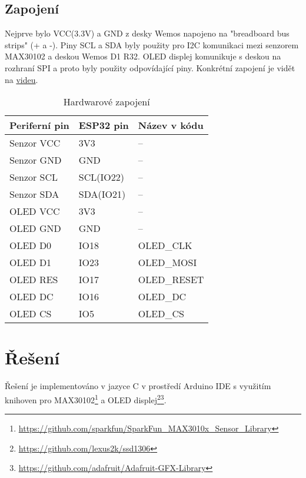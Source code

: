 \documentclass[a4paper, 12pt,h]{article}
\begin{document}
\subsection{Zapojení}
Nejprve bylo VCC(3.3V) a GND z desky Wemos napojeno na "breadboard bus strips" (+ a -). Piny SCL a SDA byly použity pro I2C komunikaci mezi senzorem MAX30102 a deskou Wemos D1 R32. OLED displej komunikuje s deskou na rozhraní SPI a proto byly použity odpovídající piny. Konkrétní zapojení je vidět na \href{https://drive.google.com/drive/u/1/folders/1VMrUQWalsoRiYowo8jg8U5sH7tqxdGtw}{videu}.

\begin{table}[ht]
    \begin{tabular}{p{2.7cm} p{2.3cm} p{2.3cm}}
        \hline
        Periferní pin & ESP32 pin & Název v kódu\\ \hline
        Senzor VCC     & 3V3  & -- \\
        Senzor GND     & GND  & -- \\
        Senzor SCL     & SCL(IO22) & -- \\
        Senzor SDA     & SDA(IO21) & -- \\
        OLED VCC       & 3V3  & -- \\
        OLED GND       & GND  & -- \\
        OLED D0        & IO18 & OLED\_CLK  \\
        OLED D1        & IO23 & OLED\_MOSI \\ 
        OLED RES       & IO17 & OLED\_RESET\\ 
        OLED DC        & IO16 & OLED\_DC   \\ 
        OLED CS        & IO5 & OLED\_CS    \\ 
    \end{tabular}
    \caption{Hardwarové zapojení}
\end{table}

\newpage

\section{Řešení}
Řešení je implementováno v jazyce C v prostředí Arduino IDE s využitím knihoven pro MAX30102\footnote{\href{https://github.com/sparkfun/SparkFun\_MAX3010x\_Sensor\_Library}{https://github.com/sparkfun/SparkFun\_MAX3010x\_Sensor\_Library}} a OLED displej\footnote{\href{https://github.com/lexus2k/ssd1306}{https://github.com/lexus2k/ssd1306}}\footnote{\href{https://github.com/adafruit/Adafruit-GFX-Library}{https://github.com/adafruit/Adafruit-GFX-Library}}.
\end{document}
